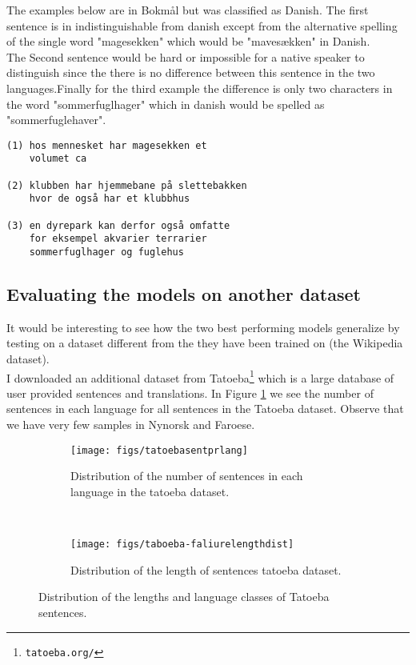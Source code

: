 The examples below are in Bokmål but was classified as Danish. The first sentence is in indistinguishable from danish except from the alternative spelling of the single word  "magesekken" which would be "mavesækken" in Danish. \\

The Second sentence would be hard or impossible for a native speaker to distinguish since the there is no difference between this sentence in the two languages.Finally for the third example the difference is only two characters in the word "sommerfuglhager" which in danish would be spelled as "sommerfuglehaver".

\begin{verbatim}
(1) hos mennesket har magesekken et
    volumet ca

(2) klubben har hjemmebane på slettebakken
    hvor de også har et klubbhus

(3) en dyrepark kan derfor også omfatte
    for eksempel akvarier terrarier
    sommerfuglhager og fuglehus
\end{verbatim}

\subsection{Evaluating the models on another dataset}
It would be interesting to see how the two best performing models generalize by testing on a dataset different from the they have been trained on (the Wikipedia dataset).\\

I downloaded an additional dataset from Tatoeba\footnote{{\tt tatoeba.org/}} which is a large database of user provided sentences and translations. In Figure \ref{tatoebasentprlang} we see the number of sentences in each language for all sentences in the Tatoeba dataset. Observe that we have very few samples in Nynorsk and Faroese.\\

\begin{figure}[h!]
    \centering
    \begin{subfigure}[b]{0.45\textwidth}
      \texttt{[image: figs/tatoebasentprlang]}
      \caption{Distribution of the number of sentences in each language in the tatoeba dataset.}
      \label{tatoebasentprlang}
    \end{subfigure}
    ~
    \begin{subfigure}[b]{0.45\textwidth}
      \texttt{[image: figs/taboeba-faliurelengthdist]}
      \caption{Distribution of the length of  sentences tatoeba dataset.}
      \label{tatoebalengths}
    \end{subfigure}
        \caption{Distribution of the lengths and language classes of Tatoeba sentences.}
\end{figure}

